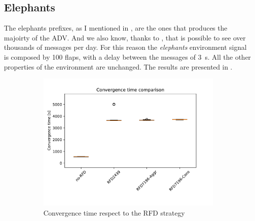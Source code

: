 \subsection{Elephants}
\label{subsec:bgp_elephants}

The elephants prefixes, as I mentioned in ,
are the ones that produces the majoirty of the \ac{ADV}.
And we also know, thanks to \cite{huston2006bgp}, that is possible to see over
thousands of messages per day.
For this reason the \textit{elephants} environment signal is composed by \num{100}
flaps, with a delay between the messages of \SI{3}{\second}.
All the other properties of the environment are unchanged.
The results are presented in .

\begin{figure}[h]
     \centering
     \begin{subfigure}[b]{0.325\textwidth}
         \centering
         \includegraphics[width=\textwidth]{images/RFD/miceVSelephants/elephants/cisco_1000MRAI30_rfd_comparison_time_boxplot.pdf}
         \caption{Convergence time respect to the RFD strategy}
         \label{fig:1000_RFD_MRAI30_time_elephant}
     \end{subfigure}
     \hfill
     \begin{subfigure}[b]{0.325\textwidth}
         \centering

\end{subfigure}
\end{figure}
